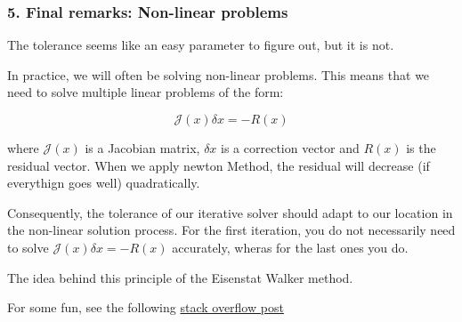 \begin{frame}
	\frametitle{\textbf{5. Final remarks: Non-linear problems}}


The tolerance seems like an easy parameter to figure out, but it is not.

In practice, we will often be solving non-linear problems. This means that we need to solve multiple linear problems of the form:

\[
\mathcal{J}(x) \delta x = - R(x)
\]

where $\mathcal{J}(x)$ is a Jacobian matrix, $\delta x$ is a correction vector and $R(x)$ is the residual vector. When we apply newton Method, the residual will decrease (if everythign goes well) quadratically. 

Consequently, the tolerance of our iterative solver should adapt to our location in the non-linear solution process. For the first iteration, you do not necessarily need to solve $\mathcal{J}(x) \delta x = - R(x)$ accurately, wheras for the last ones you do.

The idea behind this principle of the Eisenstat Walker method.

For some fun, see the following \href{https://scicomp.stackexchange.com/questions/33806/understanding-the-eisenstat-walker-method-for-choosing-the-tolerance-of-a-linear}{\color{orange}stack overflow post} 
    
\end{frame}